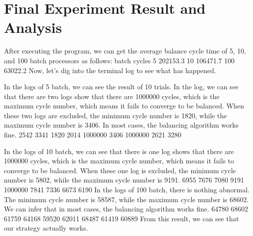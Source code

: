 \documentclass{article}%
\newenvironment{code}%
   {\snugshade\verbatim}%
   {\endverbatim\endsnugshade}
\begin{document}
\section{Final Experiment Result and Analysis}
\begin{Large}
After executing the program, we can get the average balance cycle time of 5, 10, and 100 batch processors as follows:
\begin{code}
    batch   cycles
    5       202153.3
    10      106471.7
    100     63022.2
\end{code}
Now, let's dig into the terminal log to see what has happened.

In the logs of 5 batch, we can see the result of 10 trials. In the log, we can see that there are two logs show that there are 1000000 cycles, which is the maximum cycle number, which means it fails to converge to be balanced. When these two logs are excluded, the minimum cycle number is 1820, while the maximum cycle number is 3406. In most cases, the balancing algorithm works fine.
\begin{code}
    2509 2542 3341 1820 2014 1000000 3406 1000000 2621 3280
\end{code}

In the logs of 10 batch, we can see that there is one log shows that there are 1000000 cycles, which is the maximum cycle number, which means it fails to converge to be balanced. When these one log is excluded, the minimum cycle number is 5802, while the maximum cycle number is 9191. 
\begin{code}
    5802 6955 7676 7080 9191 1000000 7841 7336 6673 6190
\end{code}
In the logs of 100 batch, there is nothing abnormal. The minimum cycle number is 58587, while the maximum cycle number is 68602. We can infer that in most cases, the balancing algorithm works fine.
\begin{code}
    58587 64780 68602 61759 64168 59520 62011 68487 61419 60889
\end{code}
From this result, we can see that our strategy actually works. 

\end{Large}
\end{document}
